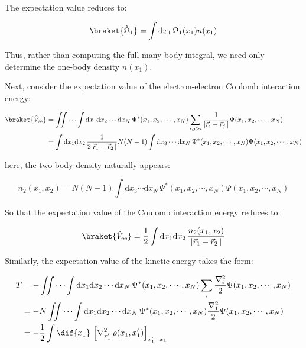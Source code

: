 
The expectation value reduces to:

\begin{equation}
    \braket{\hat\Omega_1}=\int\mathrm{d}x_1\,\Omega_1(x_1)n(x_1)
\label{observables_one-body_density}
\end{equation}

Thus, rather than computing the full many-body integral, we need only determine the one-body density $n(x_1)$.

Next, consider the expectation value of the electron-electron Coulomb interaction energy:

\begin{equation}
\begin{aligned}
    \braket{\hat{V}_\mathrm{ee}}
    &= \iint\cdots\int \mathrm{d}x_1\mathrm{d}x_2\cdots\mathrm{d}x_N\,\Psi^*(x_1,x_2,\cdots,x_N)\sum_{i,j>i}\frac{1}{|\vec{r}_i-\vec{r}_j\,|}\Psi(x_1,x_2,\cdots,x_N) \\
    &= \int\mathrm{d}x_1\mathrm{d}x_2\,\frac{1}{2|\vec{r}_1-\vec{r}_2\,|}N(N-1)\int\mathrm{d}x_3\cdots\mathrm{d}x_N\,\Psi^*(x_1,x_2,\cdots,x_N)\Psi(x_1,x_2,\cdots,x_N)
\end{aligned}
\label{coulomb_interaction_energy}
\end{equation}

here, the two-body density naturally appears:

\begin{equation}
    n_2(x_1,x_2)=N(N-1)\int\mathrm{d}x_3\cdots\mathrm{d}x_N\,\Psi^*(x_1,x_2,\cdots,x_N)\Psi(x_1,x_2,\cdots,x_N)
\label{two-body_density}
\end{equation}

So that the expectation value of the Coulomb interaction energy reduces to:

\begin{equation}
    \braket{\hat{V}_\mathrm{ee}}=\frac{1}{2}\int\mathrm{d}x_1\mathrm{d}x_2\,
    \frac{n_2(x_1,x_2)}{|\vec{r}_1-\vec{r}_2\,|}
\label{observables_two-body_density}
\end{equation}

Similarly, the expectation value of the kinetic energy takes the form:

\begin{equation}
\begin{aligned}
    T
    &= -\iint\cdots\int \mathrm{d}x_1\mathrm{d}x_2\cdots\mathrm{d}x_N\,
    \Psi^*(x_1,x_2,\cdots,x_N)\sum_i\frac{\nabla_i^2}{2}\Psi(x_1,x_2,\cdots,x_N) \\
    &= -N\iint\cdots\int \mathrm{d}x_1\mathrm{d}x_2\cdots\mathrm{d}x_N\,
    \Psi^*(x_1,x_2,\cdots,x_N)\frac{\nabla_1^2}{2}\Psi(x_1,x_2,\cdots,x_N) \\
    &= -\frac{1}{2}\int\dif{x_1}\,
    \left[\nabla_{x'_1}^{2}\,\rho(x_1,x'_1)\right]_{x'_1=x_1}
\end{aligned}
\label{kinetic_energy}
\end{equation}

